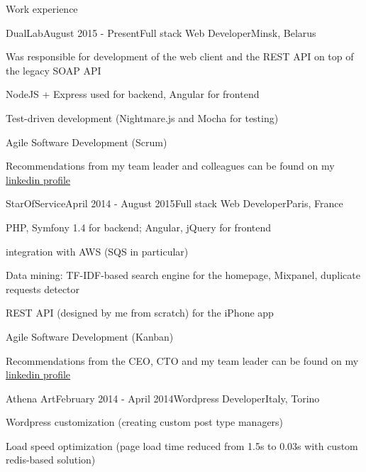 \documentclass{resume} %
\begin{document}

\begin{rSection}{Work experience}

\begin{rSubsection}{DualLab}{August 2015 - Present}{Full stack Web Developer}{Minsk, Belarus}
\item Was responsible for development of the web client and the REST API on top of the legacy SOAP API
\item NodeJS + Express used for backend, Angular for frontend 
\item Test-driven development (Nightmare.js and Mocha for testing)
\item Agile Software Development (Scrum)
\item Recommendations from my team leader and colleagues can be found on my \href{http://linkedin.com/in/mikhalchenkoa}{linkedin profile}
\end{rSubsection}


\begin{rSubsection}{StarOfService}{April 2014 - August 2015}{Full stack Web Developer}{Paris, France}
\item PHP, Symfony 1.4 for backend; Angular, jQuery for frontend
\item integration with AWS (SQS in particular)
\item Data mining: TF-IDF-based search engine for the homepage, Mixpanel, duplicate requests detector
\item REST API (designed by me from scratch) for the iPhone app 
\item Agile Software Development (Kanban)
\item Recommendations from the CEO, CTO and my team leader can be found on my \href{http://linkedin.com/in/mikhalchenkoa}{linkedin profile}
\end{rSubsection}

\begin{rSubsection}{Athena Art}{February 2014 - April 2014}{Wordpress Developer}{Italy, Torino}
\item Wordpress customization (creating custom post type managers)
\item Load speed optimization (page load time reduced from 1.5s to 0.03s with custom redis-based solution)
\end{rSubsection}


\end{rSection}
\end{document}
